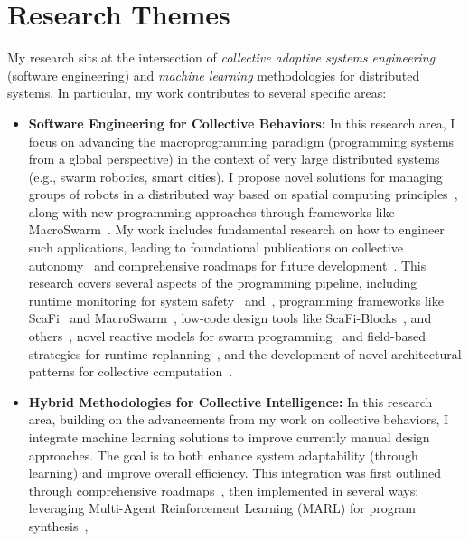 \documentclass[10pt,a4paper,roman]{moderncv}        %
\newenvironment{cvprose}%
  {\begin{list}{}{%
     \setlength{\leftmargin}{\dimexpr\hintscolumnwidth+\separatorcolumnwidth\relax}%
     \setlength{\rightmargin}{0pt}%
     \setlength{\listparindent}{0pt}%
     \setlength{\itemindent}{0pt}%
     \setlength{\labelwidth}{0pt}%
     \setlength{\topsep}{.25em}%
     \setlength{\parsep}{.5em}%
     \setlength{\partopsep}{0pt}}%
   \item\relax}%
  {\end{list}}
\newcommand{\cvsection}[1]{\Needspace{6\baselineskip}\section{#1}}
\begin{document}
\cvsection{Research Themes}\label{sec:research-themes}
\begin{cvprose}
My research sits at the intersection of \emph{collective adaptive systems engineering} (software engineering) and \emph{machine learning} methodologies for distributed systems. In particular, my work contributes to several specific areas:
\begin{itemize}
  \item \textbf{Software Engineering for Collective Behaviors:} In this research area, I focus on advancing the macroprogramming paradigm (programming systems from a global perspective) in the context of very large distributed systems (e.g., swarm robotics, smart cities). 
  I propose novel solutions for managing groups of robots in a distributed way based on spatial computing principles~, 
  along with new programming approaches through frameworks like MacroSwarm~. 
  My work includes fundamental research on how to engineer such applications, 
  leading to foundational publications on collective autonomy~ and comprehensive roadmaps for future development~. 
  This research covers several aspects of the programming pipeline, 
  including runtime monitoring for system safety~ and~,
  programming frameworks like ScaFi~ and MacroSwarm~, low-code design tools like ScaFi-Blocks~, and others~, 
  novel reactive models for swarm programming~ and field-based strategies for runtime replanning~,
  and the development of novel architectural patterns for collective computation~.
  \item \textbf{Hybrid Methodologies for Collective Intelligence:} In this research area, building on the advancements from my work on collective behaviors, 
  I integrate machine learning solutions to improve currently manual design approaches. 
  The goal is to both enhance system adaptability (through learning) 
  and improve overall efficiency. 
  This integration was first outlined through comprehensive roadmaps~,
  then implemented in several ways: 
  leveraging Multi-Agent Reinforcement Learning (MARL) for program synthesis~, 

\end{itemize}
\end{cvprose}
\end{document}
